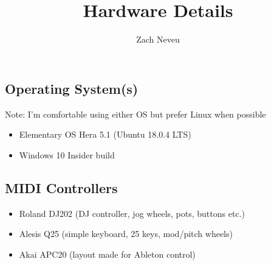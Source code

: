 \documentclass[12pt, letter]{article}
\author{Zach Neveu}
\title{ Hardware Details }
\begin{document}
\maketitle

\subsection*{Operating System(s)}
Note: I'm comfortable using either OS but prefer Linux when possible
\begin{itemize}
	\item Elementary OS Hera 5.1 (Ubuntu 18.0.4 LTS)
	\item Windows 10 Insider build
\end{itemize}

\subsection*{MIDI Controllers}
\begin{itemize}
	\item Roland DJ202 (DJ controller, jog wheels, pots, buttons etc.)
	\item Alesis Q25 (simple keyboard, 25 keys, mod/pitch wheels)
	\item Akai APC20 (layout made for Ableton control)
\end{itemize}
\end{document}
